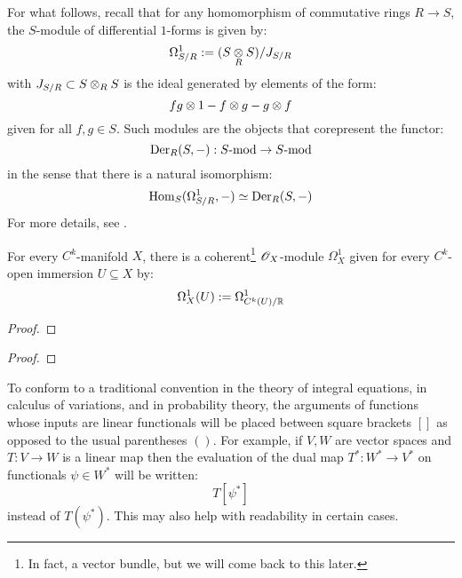         For what follows, recall that for any homomorphism of commutative rings $R \to S$, the $S$-module of differential $1$-forms is given by:
            $$\Omega^1_{S/R} := (S \tensor_R S)/J_{S/R}$$
        with $J_{S/R} \subset S \tensor_R S$ is the ideal generated by elements of the form:
            $$fg \tensor 1 - f \tensor g - g \tensor f$$
        given for all $f, g \in S$. Such modules are the objects that corepresent the functor:
            $$\mathrm{Der}_R(S, -): S\text{-}\mathrm{mod} \to S\text{-}\mathrm{mod}$$
        in the sense that there is a natural isomorphism:
            $$\mathrm{Hom}_S(\Omega^1_{S/R}, -) \simeq \mathrm{Der}_R(S, -)$$
        For more details, see \cite[\href{https://stacks.math.columbia.edu/tag/00RM}{Tag 00RM}]{stacks}.
        \begin{lemma} \label{lemma: cotangent_sheaves_and_budnles}
            For every $C^k$-manifold $X$, there is a coherent\footnote{In fact, a vector bundle, but we will come back to this later.} $\mathscr{O}_X$-module $\Omega^1_X$ given for every $C^k$-open immersion $U \subseteq X$ by:
                $$\Omega^1_X(U) := \Omega^1_{C^k(U)/\mathbb{R}}$$
        \end{lemma}
            \begin{proof}
                
            \end{proof}
        \begin{corollary} \label{coro: tangent_sheaves_and_bundles}
            
        \end{corollary}
        \begin{lemma}
            
        \end{lemma}
            \begin{proof}
                
            \end{proof}
        \begin{convention}
            To conform to a traditional convention in the theory of integral equations, in calculus of variations, and in probability theory, the arguments of functions whose inputs are linear functionals will be placed between square brackets $[]$ as opposed to the usual parentheses $()$. For example, if $V, W$ are vector spaces and $T: V \to W$ is a linear map then the evaluation of the dual map $T^*: W^* \to V^*$ on functionals $\psi \in W^*$ will be written:
                $$T[\psi^*]$$
            instead of $T(\psi^*)$. This may also help with readability in certain cases. 
        \end{convention}
